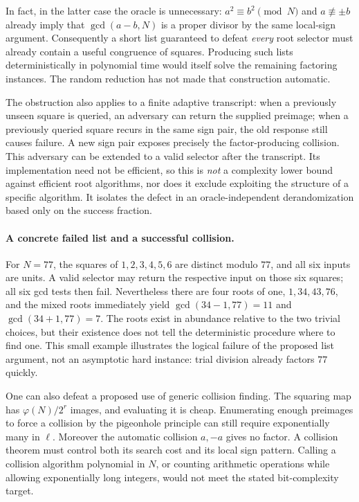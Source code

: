 \documentclass[11pt]{article}
\begin{document}
In fact, in the latter case the oracle is unnecessary:
$a^2\equiv b^2\pmod N$ and $a\not\equiv\pm b$ already imply that
$\gcd(a-b,N)$ is a proper divisor by the same local-sign argument.
Consequently a short list guaranteed to defeat \emph{every} root selector
must already contain a useful congruence of squares. Producing such lists
deterministically in polynomial time would itself solve the remaining
factoring instances. The random reduction has not made that construction
automatic.

The obstruction also applies to a finite adaptive transcript: when a
previously unseen square is queried, an adversary can return the supplied
preimage; when a previously queried square recurs in the same sign pair,
the old response still causes failure. A new sign pair exposes precisely
the factor-producing collision. This adversary can be extended to a
valid selector after the transcript. Its implementation need not be
efficient, so this is \emph{not} a complexity lower bound against efficient
root algorithms, nor does it exclude exploiting the structure of a
specific algorithm. It isolates the defect in an oracle-independent
derandomization based only on the success fraction.

\paragraph{A concrete failed list and a successful collision.}
For $N=77$, the squares of $1,2,3,4,5,6$ are distinct modulo $77$,
and all six inputs are units. A valid selector may return the respective
input on those six squares; all six gcd tests then fail. Nevertheless
there are four roots of one,
$1,34,43,76$, and the mixed roots immediately yield
$\gcd(34-1,77)=11$ and $\gcd(34+1,77)=7$.
The roots exist in abundance relative to the two trivial choices, but
their existence does not tell the deterministic procedure where to find
one. This small example illustrates the logical failure of the proposed
list argument, not an asymptotic hard instance: trial division already
factors $77$ quickly.

One can also defeat a proposed use of generic collision finding. The
squaring map has $\varphi(N)/2^r$ images, and evaluating it is cheap.
Enumerating enough preimages to force a collision by the pigeonhole
principle can still require exponentially many in $\ell$. Moreover the
automatic collision $a,-a$ gives no factor. A collision theorem must
control both its search cost and its local sign pattern. Calling a
collision algorithm polynomial in $N$, or counting arithmetic operations
while allowing exponentially long integers, would not meet the stated
bit-complexity target.
\end{document}
